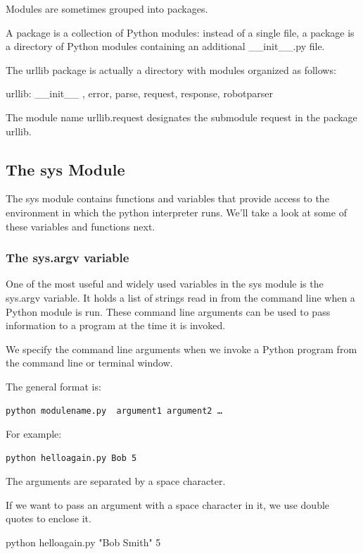 \documentclass{article}
\begin{document}
Modules are sometimes grouped into packages.

A package is a collection of Python modules: instead of a single file, a package is a directory of Python modules containing an additional {\_}{\_}init{\_}{\_}.py file.

The urllib package is actually a directory with modules organized as follows:

urllib: {\_}{\_}init{\_}{\_} , error, parse, request, response, robotparser

The module name urllib.request designates the submodule request in the package urllib.

\subsection{The sys Module}
The sys module contains functions and variables that provide access to the environment in which the python interpreter runs.  We'll take a look at some of these variables and functions next.

\subsubsection{The sys.argv variable}

One of the most useful and widely used variables in the sys module is the sys.argv variable.  It  holds a list of strings read in from the command line when a Python module is run.   These command line arguments can be used to pass information to a program at the time it is invoked.

We specify the command line arguments when we invoke a Python program from the command line or terminal window.


The general format is:

\begin{lstlisting}
python modulename.py  argument1 argument2 …
\end{lstlisting}

For example:

\begin{lstlisting}
python helloagain.py Bob 5
\end{lstlisting}

The arguments are separated by a space character.

If we want to pass an argument with a space character in it, we use double quotes to enclose it.

python helloagain.py "Bob Smith"  5
\end{document}
